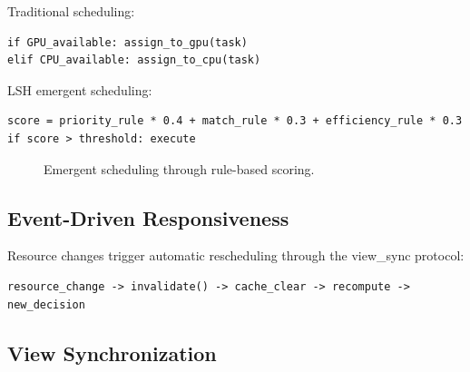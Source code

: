 \documentclass{article}
\begin{document}
Traditional scheduling:
\begin{verbatim}
if GPU_available: assign_to_gpu(task)
elif CPU_available: assign_to_cpu(task)
\end{verbatim}

LSH emergent scheduling:
\begin{verbatim}
score = priority_rule * 0.4 + match_rule * 0.3 + efficiency_rule * 0.3
if score > threshold: execute
\end{verbatim}

\begin{figure}[t]
\centering
{}
\caption{Emergent scheduling through rule-based scoring.}
\label{fig:scheduling}
\end{figure}

\subsection{Event-Driven Responsiveness}

Resource changes trigger automatic rescheduling through the view\_sync protocol:

\begin{verbatim}
resource_change -> invalidate() -> cache_clear -> recompute -> new_decision
\end{verbatim}

\subsection{View Synchronization}
\end{document}
